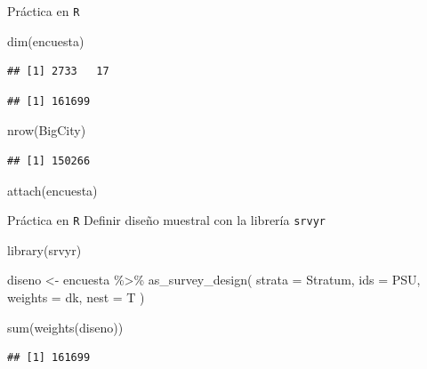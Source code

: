 \documentclass[
  english,
  ignorenonframetext,
]{beamer}
\newenvironment{Shaded}{\begin{snugshade}}{\end{snugshade}}
\newcommand{\AttributeTok}[1]{\textcolor[rgb]{0.77,0.63,0.00}{#1}}
\newcommand{\FunctionTok}[1]{\textcolor[rgb]{0.00,0.00,0.00}{#1}}
\newcommand{\NormalTok}[1]{#1}
\newcommand{\OtherTok}[1]{\textcolor[rgb]{0.56,0.35,0.01}{#1}}
\newcommand{\SpecialCharTok}[1]{\textcolor[rgb]{0.00,0.00,0.00}{#1}}
\begin{document}
\begin{frame}[fragile]{Práctica en \texttt{R}}
\protect\hypertarget{pruxe1ctica-en-r-10}{}
\begin{Shaded}
\begin{Highlighting}[]
\FunctionTok{dim}\NormalTok{(encuesta)}
\end{Highlighting}
\end{Shaded}

\begin{verbatim}
## [1] 2733   17
\end{verbatim}

\begin{Shaded}
\end{Shaded}

\begin{verbatim}
## [1] 161699
\end{verbatim}

\begin{Shaded}
\begin{Highlighting}[]
\FunctionTok{nrow}\NormalTok{(BigCity)}
\end{Highlighting}
\end{Shaded}

\begin{verbatim}
## [1] 150266
\end{verbatim}

\begin{Shaded}
\begin{Highlighting}[]
\FunctionTok{attach}\NormalTok{(encuesta)}
\end{Highlighting}
\end{Shaded}
\end{frame}

\begin{frame}[fragile]{Práctica en \texttt{R}}
\protect\hypertarget{pruxe1ctica-en-r-11}{}
Definir diseño muestral con la librería \texttt{srvyr}

\begin{Shaded}
\begin{Highlighting}[]
\FunctionTok{library}\NormalTok{(srvyr)}

\NormalTok{diseno }\OtherTok{\textless{}{-}}\NormalTok{ encuesta }\SpecialCharTok{\%\textgreater{}\%}
  \FunctionTok{as\_survey\_design}\NormalTok{(}
    \AttributeTok{strata =}\NormalTok{ Stratum,}
    \AttributeTok{ids =}\NormalTok{ PSU,}
    \AttributeTok{weights =}\NormalTok{ dk,}
    \AttributeTok{nest =}\NormalTok{ T}
\NormalTok{  )}

\FunctionTok{sum}\NormalTok{(}\FunctionTok{weights}\NormalTok{(diseno))}
\end{Highlighting}
\end{Shaded}

\begin{verbatim}
## [1] 161699
\end{verbatim}
\end{frame}
\end{document}

